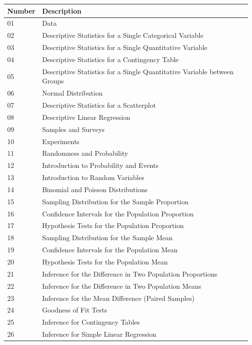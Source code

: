 \documentclass{article}\usepackage[]{graphicx}\usepackage[]{color}
\numberwithin{equation}{section} %
\begin{document}
\begin{center}
\label{tab:topics}
\begin{tabular} { | l | l | }
\hline \textbf{Number} & \textbf{Description} \\
\hline
01 & Data \\
\hline
02  & Descriptive Statistics for a Single Categorical Variable \\
\hline
03 & Descriptive Statistics for a Single Quantitative Variable \\
\hline
04 & Descriptive Statistics for a Contingency Table \\
\hline
05 & Descriptive Statistics for a Single Quantitative Variable between Groups \\
\hline
06 & Normal Distribution \\
\hline
07 & Descriptive Statistics for a Scatterplot \\
\hline
08 & Descriptive Linear Regression \\
\hline
09 & Samples and Surveys \\
\hline
10 & Experiments \\
\hline
11 & Randomness and Probability \\
\hline
12 & Introduction to Probability and Events \\
\hline
13 & Introduction to Random Variables \\
\hline
14 & Binomial and Poisson Distributions \\
\hline
15 & Sampling Distribution for the Sample Proportion \\
\hline
16 & Confidence Intervals for the Population Proportion \\
\hline
17 & Hypothesis Tests for the Population Proportion \\
\hline
18 & Sampling Distribution for the Sample Mean \\
\hline
19 & Confidence Intervals for the Population Mean \\
\hline
20 & Hypothesis Tests for the Population Mean \\
\hline
21 & Inference for the Difference in Two Population Proportions \\
\hline
22 & Inference for the Difference in Two Population Means \\
\hline
23 & Inference for the Mean Difference (Paired Samples) \\
\hline
24 & Goodness of Fit Tests \\
\hline
25 & Inference for Contingency Tables \\
\hline
26 & Inference for Simple Linear Regression \\
\hline
\end{tabular}
\end{center}
\end{document}
